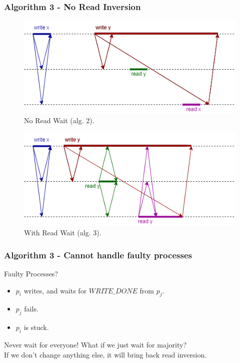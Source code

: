 \begin{frame}
    \frametitle{Algorithm 3 - No Read Inversion}
    \begin{center}
        \begin{figure}
            \includegraphics[scale=.35]{resources/alg2_incorrectness.png}
            \caption*{No Read Wait (alg. 2).}
        \end{figure}
        \begin{figure}
            \includegraphics[scale=.35]{resources/alg3_no_read_inversion.png}
            \caption*{With Read Wait (alg. 3).}
        \end{figure}
    \end{center}
\end{frame}

\begin{frame}
    \frametitle{Algorithm 3 - Cannot handle faulty processes}
    \begin{alertblock}{Faulty Processes?}
        \begin{itemize}
            \item $p_i$ writes, and waits for $WRITE\_DONE$ from $p_j$.
            \item $p_j$ fails.
            \item $p_i$ is stuck.
        \end{itemize}
    \end{alertblock}
    \begin{block}{Never wait for everyone!}
        What if we just wait for majority?\\
        If we don't change anything else, it will bring back read inversion.
    \end{block}
\end{frame}

